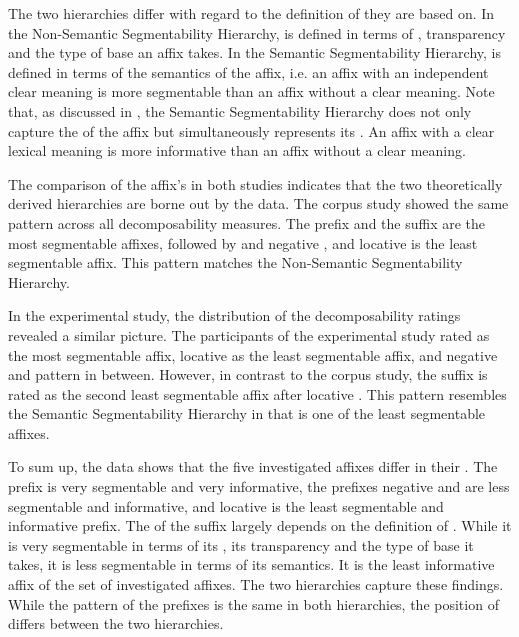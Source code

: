 The two hierarchies differ with regard to the definition of  they are based on. %
In the Non-Semantic Segmentability Hierarchy,  is defined in terms of , transparency and the type of base an affix takes. In the Semantic Segmentability Hierarchy,  is defined in terms of the semantics of the affix, i.e. an affix with an independent clear meaning is more segmentable than an affix without a clear meaning. Note that, as discussed in , the Semantic Segmentability Hierarchy does not only capture the  of the affix but simultaneously represents its . An affix with a clear lexical meaning is more informative than an affix without a clear meaning.


The comparison of the affix's  in both studies indicates that the two theoretically derived  hierarchies are borne out by the data.
 The corpus study showed the same  pattern across all decomposability measures.
 The prefix  and the suffix  are the most segmentable affixes, followed by  and negative , and locative  is the least segmentable affix. This pattern matches the Non-Semantic Segmentability Hierarchy.


In the experimental study, the distribution of the decomposability ratings revealed a similar picture. The participants of the experimental study rated  as the most segmentable affix, locative  as the least segmentable affix, and negative  and  pattern in between. However, in contrast to the corpus study, the suffix  is rated as the second least segmentable affix after locative . This pattern resembles the Semantic Segmentability Hierarchy in that  is one of the least segmentable affixes.

To sum up, the data shows that the five investigated affixes differ in their . The prefix  is very segmentable and very informative, the prefixes negative  and  are less segmentable and informative, and locative  is the least segmentable and informative prefix. The  of the suffix  largely depends on the definition of . While it is very segmentable in terms of its , its transparency and the type of base it takes, it is less segmentable in terms of its semantics. It is the least informative affix of the set of investigated affixes.
The two  hierarchies capture these findings. While the  pattern of the prefixes is the same in both hierarchies, the position of  differs between the two hierarchies. 


